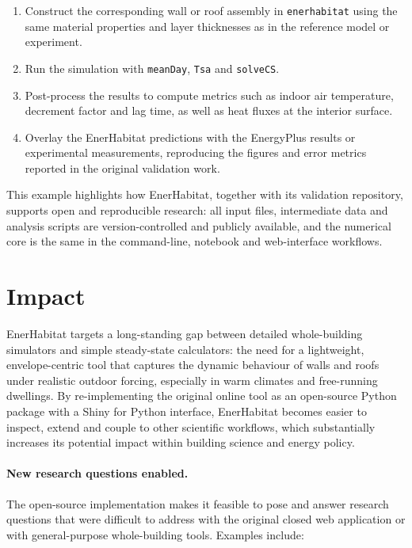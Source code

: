 \documentclass[preprint,12pt, a4paper]{elsarticle}
\begin{document}
\begin{enumerate}
  \item Construct the corresponding wall or roof assembly in \texttt{enerhabitat} using the same material properties and layer thicknesses as in the reference model or experiment.
  \item Run the simulation with \texttt{meanDay}, \texttt{Tsa} and \texttt{solveCS}.
  \item Post-process the results to compute metrics such as indoor air temperature, decrement factor and lag time, as well as heat fluxes at the interior surface.
  \item Overlay the EnerHabitat predictions with the EnergyPlus results or experimental measurements, reproducing the figures and error metrics reported in the original validation work.
\end{enumerate}

This example highlights how EnerHabitat, together with its validation repository, supports open and reproducible research: all input files, intermediate data and analysis scripts are version-controlled and publicly available, and the numerical core is the same in the command-line, notebook and web-interface workflows.


\section{Impact}

EnerHabitat targets a long-standing gap between detailed whole-building simulators and simple steady-state calculators: the need for a lightweight, envelope-centric tool that captures the dynamic behaviour of walls and roofs under realistic outdoor forcing, especially in warm climates and free-running dwellings.\citep{barrios2016enerhabitat} By re-implementing the original online tool as an open-source Python package with a Shiny for Python interface, EnerHabitat becomes easier to inspect, extend and couple to other scientific workflows, which substantially increases its potential impact within building science and energy policy.

\paragraph{New research questions enabled.}

The open-source implementation makes it feasible to pose and answer research questions that were difficult to address with the original closed web application or with general-purpose whole-building tools. Examples include:
\end{document}

